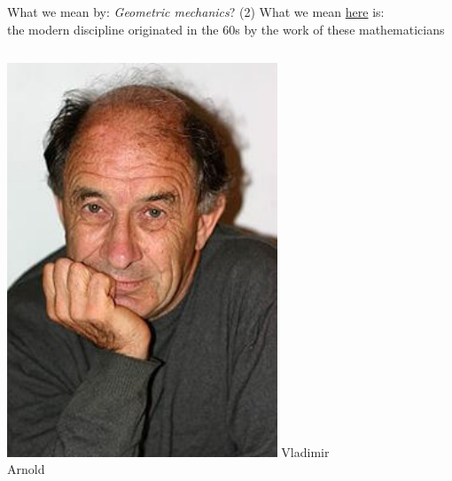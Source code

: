 \documentclass[handout,10pt]{beamer}
\begin{document}
\begin{frame}{What we mean by: \emph{Geometric mechanics}? (2)}
	What we mean \underline{here} is:
	\\
	the modern discipline originated in the 60s by the work of these mathematicians%
	
	\vfill
	\begin{columns}[T]
		\begin{column}{.2\textwidth}
			\center
			\includegraphics[width=0.8\textwidth]{Pictures/FFat/arnold}
			Vladimir \\ 
			Arnold
		\end{column}
		\begin{column}{.2\textwidth}
			\center

\end{column}
\end{columns}
\end{frame}
\end{document}
